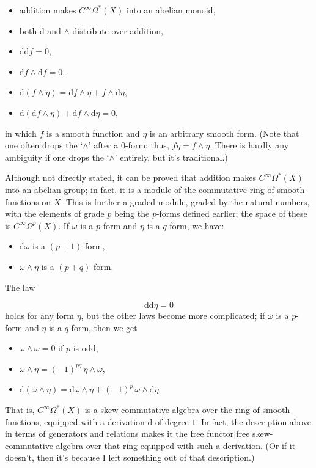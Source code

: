 \documentclass[preprint, 5p, 10pt]{elsarticle}
\theoremstyle{plain}
\begin{document}
\begin{itemize}%
\item addition makes $C^\infty\Omega^*(X)$ into an abelian monoid,
\item both $\mathrm{d}$ and $\wedge$ distribute over addition,
\item $\mathrm{d}\mathrm{d}f = 0$,
\item $\mathrm{d}f \wedge \mathrm{d}f = 0$,
\item $\mathrm{d}(f \wedge \eta) = \mathrm{d}f \wedge \eta + f \wedge \mathrm{d}\eta$,
\item $\mathrm{d}(\mathrm{d}f \wedge \eta) + \mathrm{d}f \wedge \mathrm{d}\eta = 0$,

\end{itemize}
in which $f$ is a smooth function and $\eta$ is an arbitrary smooth form. (Note that one often drops the ‘$\wedge$’ after a $0$-form; thus, $f \eta = f \wedge \eta$. There is hardly any ambiguity if one drops the ‘$\wedge$’ entirely, but it'{}s traditional.)

Although not directly stated, it can be proved that addition makes $C^\infty\Omega^*(X)$ into an abelian group; in fact, 
it is a module of the commutative ring of smooth functions on $X$. This is further a graded module, graded by the natural numbers, 
with the elements of grade $p$ being the $p$-forms defined earlier; the space of these is $C^\infty\Omega^p(X)$. If $\omega$ 
is a $p$-form and $\eta$ is a $q$-form, we have:

\begin{itemize}%
\item $\mathrm{d}\omega$ is a $(p+1)$-form,
\item $\omega \wedge \eta$ is a $(p+q)$-form.

\end{itemize}
The law

\begin{displaymath}
\mathrm{d}\mathrm{d}\eta = 0
\end{displaymath}
holds for any form $\eta$, but the other laws become more complicated; if $\omega$ is a $p$-form and $\eta$ is a $q$-form, then we get

\begin{itemize}%
\item $\omega \wedge \omega = 0$ if $p$ is odd,
\item $\omega \wedge \eta = (-1)^{pq}\, \eta \wedge \omega$,
\item $\mathrm{d}(\omega \wedge \eta) = \mathrm{d}\omega \wedge \eta + (-1)^p\, \omega \wedge \mathrm{d}\eta$.

\end{itemize}
That is, $C^\infty\Omega^*(X)$ is a skew-commutative algebra over the ring of smooth functions, equipped with a derivation $\mathrm{d}$ of degree $1$. In fact, the description above in terms of generators and relations makes it the free functor|free skew-commutative algebra over that ring equipped with such a derivation. (Or if it doesn'{}t, then it'{}s because I left something out of that description.)
\end{document}
